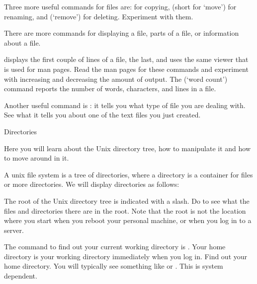 Three more useful commands for files are:  for copying, 
(short for `move') for renaming, and  (`remove') for deleting.
Experiment with them.

There are more commands for displaying a file, parts of a file, or
information about a file. 

{ displays the first couple of lines of a file,  the
  last, and  uses the same viewer that is used for man
  pages. Read the man pages for these commands and experiment with
  increasing and decreasing the amount of output. 
  The  (`word count') command reports the number of words,
  characters, and lines in a file.}{}

Another useful command is : it tells you what
type of file you are dealing with. See what it tells you about
one of the text files you just created.

 {Directories}

\begin{purpose}
  Here you will learn about the Unix directory tree, how to manipulate
  it and how to move around in it.
\end{purpose}

A unix file system is a tree of directories, where a directory is a
container for files or more directories. We will display directories
as follows:


The root of the Unix directory tree is indicated with a slash. Do
 to see what the files and directories there are in the
root. Note that the root is not the location where you start when you
reboot your personal machine, or when you log in to a server.

\practical
{The command to find out your current working directory
is . Your home directory is your working directory immediately
when you log in. Find out your home directory.}
{You will typically see something like  or
  . This is system dependent.}{}

